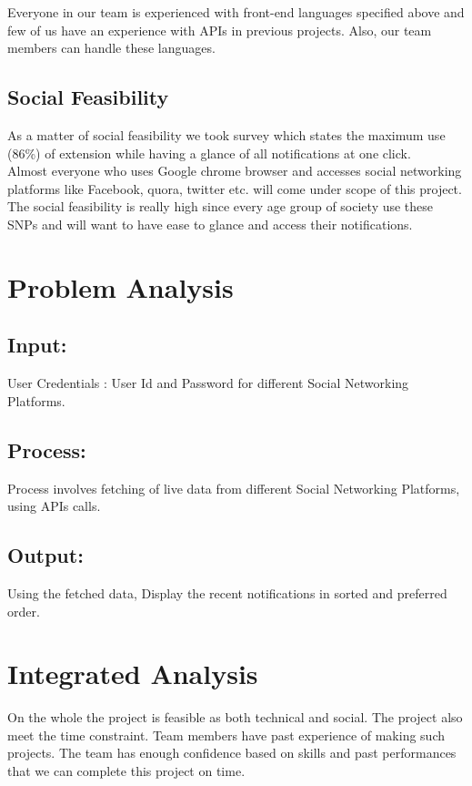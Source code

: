 \documentclass[12pt]{article}
\begin{document}
\hspace{10pt}	
	Everyone in our team is experienced with front-end languages specified above and few of us have an experience with APIs in previous projects. Also, our team members can handle these languages.
	\subsection{Social Feasibility}
	As a matter of social feasibility we took survey which states the maximum use (86\%) of extension while having a glance of all notifications at one click.\\Almost everyone who uses Google chrome  browser and accesses social networking platforms like Facebook, quora, twitter etc. will come under scope of this project.\\The social feasibility is really high since every age group of society use these SNPs and will want to have ease to glance and access their notifications.
	\section{Problem Analysis}
	\subsection{Input:} 
	User Credentials : User Id and Password for different Social Networking Platforms.
	\subsection{Process:} Process involves fetching of live data from different Social Networking Platforms, using APIs calls. 
	\subsection{Output:} 
	Using the fetched data, Display the recent notifications in sorted and preferred order.
	
    \section{Integrated Analysis}
    On the whole the project is feasible as both technical and social. The project
also meet the time constraint. Team members have past experience of
making such projects. The team has enough confidence based on skills and past
performances that we can complete this project on time.
	\newpage
	
	
\end{document}
